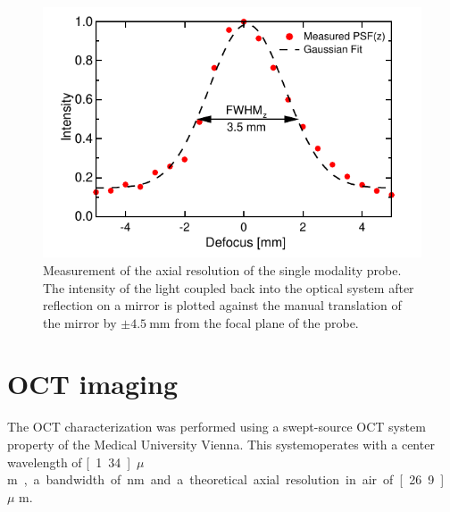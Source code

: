 \documentclass[10pt]{iopart}
\begin{document}
\begin{figure}[h!]\centering \includegraphics[width=\columnwidth]{figures/PSFz.pdf}
      \caption{Measurement of the axial resolution of the single modality probe. The intensity of the light coupled back into the optical system after reflection on a mirror is plotted against the manual translation of the mirror by $\pm \SI{4.5}{\milli\meter}$ from the focal plane of the probe. }
      \label{fig:FWHM}
\end{figure}




\section{OCT imaging}

The OCT characterization was performed using a swept-source OCT system property of the Medical University Vienna. This systemoperates with a center wavelength of \unit[1.34]{$\mu$ m}, a bandwidth of \unit[37]{nm} and a theoretical axial resolution in air of \unit[26.9]{$\mu$ m}.
\end{document}
